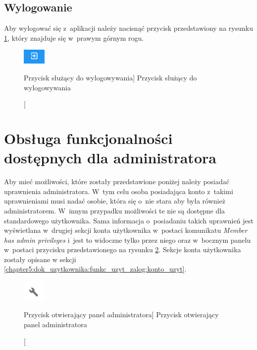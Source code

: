 \documentclass[../Kamil_Kowalewski_Main.tex]{subfiles}
\begin{document}
{{        \subsection{Wylogowanie}
        \label{chapter5:dok_uzytkownika:funkc_uzyt_zalog:wylogowanie} {
            Aby wylogować się z~aplikacji należy nacisnąć przycisk przedstawiony na
            rysunku
            \ref{chapter5:dok_uzytkownika:funkc_uzyt_zalog:wylogowanie:logout_button},
            który znajduje się w~prawym górnym rogu.

            \begin{figure}[H]
                \centering
                \includegraphics[width=0.1\textwidth, keepaspectratio]
                {img/chapter5/loggedin/logout_button.png}
                \caption
                [Przycisk służący do wylogowywania]
                {Przycisk służący do wylogowywania}
                \label{chapter5:dok_uzytkownika:funkc_uzyt_zalog:wylogowanie:logout_button}
            \end{figure}
        }
    }

    \section{Obsługa funkcjonalności dostępnych dla administratora}
    \label{chapter5:dok_uzytkownika:funkc_admin} {
        Aby mieć możliwości, które zostały przedstawione poniżej należy posiadać
        uprawnienia administratora. W~tym celu osoba posiadająca konto z~takimi
        uprawnieniami musi nadać osobie, która się o~nie stara aby była również
        administratorem. W~innym przypadku możliwości te nie są dostępne dla
        standardowego użytkownika. Sama informacja o~posiadaniu takich uprawnień jest
        wyświetlana w~drugiej sekcji konta użytkownika w~postaci komunikatu
        \textit{Member has admin privileges} i~jest to widoczne tylko przez
        niego oraz w~bocznym panelu w~postaci przycisku przedstawionego na rysunku
        \ref{chapter5:dok_uzytkownika:funkc_admin:admin_button}.
        Sekcje konta użytkownika zostały opisane w sekcji
        \ref{chapter5:dok_uzytkownika:funkc_uzyt_zalog:konto_uzyt}.

        \begin{figure}[H]
            \centering
            \includegraphics[width=0.1\textwidth, keepaspectratio]
            {img/chapter5/admin/admin_button.png}
            \caption
            [Przycisk otwierający panel administratora]
            {Przycisk otwierający panel administratora}
            \label{chapter5:dok_uzytkownika:funkc_admin:admin_button}
        \end{figure}

}}
\end{document}
